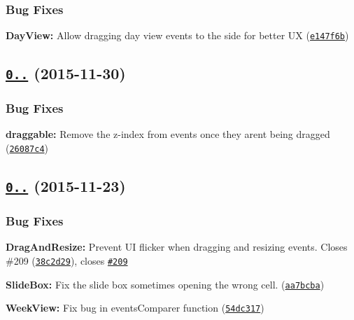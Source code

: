 \subsubsection*{Bug Fixes}


\begin{DoxyItemize}
\item {\bfseries Day\+View\+:} Allow dragging day view events to the side for better UX (\href{https://github.com/mattlewis92/angular-bootstrap-calendar/commit/e147f6b}{\tt e147f6b})
\end{DoxyItemize}

\label{_0.17.2}%
 \subsection*{\href{https://github.com/mattlewis92/angular-bootstrap-calendar/compare/0.17.1...v0.17.2}{\tt 0..} (2015-\/11-\/30)}

\subsubsection*{Bug Fixes}


\begin{DoxyItemize}
\item {\bfseries draggable\+:} Remove the z-\/index from events once they aren\textquotesingle{}t being dragged (\href{https://github.com/mattlewis92/angular-bootstrap-calendar/commit/26087c4}{\tt 26087c4})
\end{DoxyItemize}

\label{_0.17.1}%
 \subsection*{\href{https://github.com/mattlewis92/angular-bootstrap-calendar/compare/0.17.0...v0.17.1}{\tt 0..} (2015-\/11-\/23)}

\subsubsection*{Bug Fixes}


\begin{DoxyItemize}
\item {\bfseries Drag\+And\+Resize\+:} Prevent UI flicker when dragging and resizing events. Closes \#209 (\href{https://github.com/mattlewis92/angular-bootstrap-calendar/commit/38c2d29}{\tt 38c2d29}), closes \href{https://github.com/mattlewis92/angular-bootstrap-calendar/issues/209}{\tt \#209}
\item {\bfseries Slide\+Box\+:} Fix the slide box sometimes opening the wrong cell. (\href{https://github.com/mattlewis92/angular-bootstrap-calendar/commit/aa7bcba}{\tt aa7bcba})
\item {\bfseries Week\+View\+:} Fix bug in events\+Comparer function (\href{https://github.com/mattlewis92/angular-bootstrap-calendar/commit/54dc317}{\tt 54dc317})
\end{DoxyItemize}


